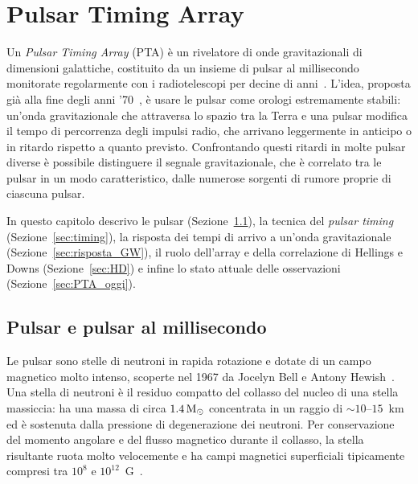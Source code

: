 
\chapter{Pulsar Timing Array} \label{chpt:PTA}
\sloppy

Un \textit{Pulsar Timing Array} (PTA) è un rivelatore di onde gravitazionali di dimensioni galattiche, costituito da un insieme di pulsar al millisecondo monitorate regolarmente con i radiotelescopi per decine di anni~\cite{FosterBacker1990}. L'idea, proposta già alla fine degli anni '70~\cite{Sazhin1978, Detweiler1979}, è usare le pulsar come orologi estremamente stabili: un'onda gravitazionale che attraversa lo spazio tra la Terra e una pulsar modifica il tempo di percorrenza degli impulsi radio, che arrivano leggermente in anticipo o in ritardo rispetto a quanto previsto. Confrontando questi ritardi in molte pulsar diverse è possibile distinguere il segnale gravitazionale, che è correlato tra le pulsar in un modo caratteristico, dalle numerose sorgenti di rumore proprie di ciascuna pulsar.

In questo capitolo descrivo le pulsar (Sezione~\ref{sec:pulsar}), la tecnica del \textit{pulsar timing} (Sezione~\ref{sec:timing}), la risposta dei tempi di arrivo a un'onda gravitazionale (Sezione~\ref{sec:risposta_GW}), il ruolo dell'array e della correlazione di Hellings e Downs (Sezione~\ref{sec:HD}) e infine lo stato attuale delle osservazioni (Sezione~\ref{sec:PTA_oggi}).

\section{Pulsar e pulsar al millisecondo} \label{sec:pulsar}

Le pulsar sono stelle di neutroni in rapida rotazione e dotate di un campo magnetico molto intenso, scoperte nel 1967 da Jocelyn Bell e Antony Hewish~\cite{Hewish1968}. Una stella di neutroni è il residuo compatto del collasso del nucleo di una stella massiccia: ha una massa di circa $1.4\,\mathrm{M}_\odot$ concentrata in un raggio di $\sim 10$--$15$~km ed è sostenuta dalla pressione di degenerazione dei neutroni. Per conservazione del momento angolare e del flusso magnetico durante il collasso, la stella risultante ruota molto velocemente e ha campi magnetici superficiali tipicamente compresi tra $10^8$ e $10^{12}$~G~\cite{LorimerKramer2005}.

